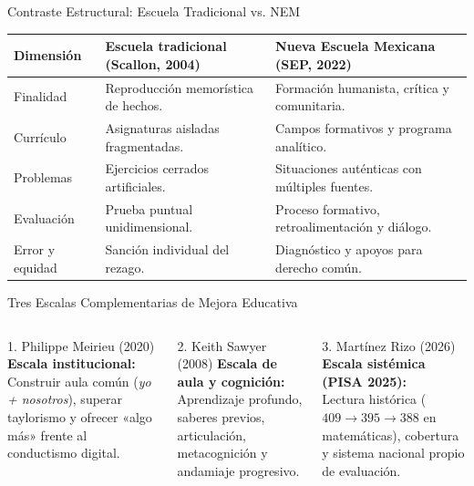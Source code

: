 \documentclass[aspectratio=169,spanish,xcolor=table]{beamer}
\begin{document}
\begin{frame}{Contraste Estructural: Escuela Tradicional vs. NEM}
  \renewcommand{\arraystretch}{1.25}
  \scriptsize
  \begin{tabular}{p{2.6cm}p{5.2cm}p{5.5cm}}
    \toprule
    \textbf{Dimensión} & \textbf{Escuela tradicional (Scallon, 2004)} & \textbf{Nueva Escuela Mexicana (SEP, 2022)} \\
    \midrule
    Finalidad & Reproducción memorística de hechos. & Formación humanista, crítica y comunitaria. \\
    Currículo & Asignaturas aisladas fragmentadas. & Campos formativos y programa analítico. \\
    Problemas & Ejercicios cerrados artificiales. & Situaciones auténticas con múltiples fuentes. \\
    Evaluación & Prueba puntual unidimensional. & Proceso formativo, retroalimentación y diálogo. \\
    Error y equidad & Sanción individual del rezago. & Diagnóstico y apoyos para derecho común. \\
    \bottomrule
  \end{tabular}
\end{frame}

\begin{frame}[plain]
  \centering
  \resizebox{0.97\textwidth}{!}{}
\end{frame}

\begin{frame}{Tres Escalas Complementarias de Mejora Educativa}
  \begin{columns}[T]
      \begin{block}{1. Philippe Meirieu (2020)}
        \scriptsize\textbf{Escala institucional:}\\
        Construir aula común (\textit{yo + nosotros}), superar taylorismo y ofrecer «algo más» frente al conductismo digital.
      \end{block}
      \begin{block}{2. Keith Sawyer (2008)}
        \scriptsize\textbf{Escala de aula y cognición:}\\
        Aprendizaje profundo, saberes previos, articulación, metacognición y andamiaje progresivo.
      \end{block}
      \begin{block}{3. Martínez Rizo (2026)}
        \scriptsize\textbf{Escala sistémica (PISA 2025):}\\
        Lectura histórica ($409\to 395\to 388$ en matemáticas), cobertura y sistema nacional propio de evaluación.
      \end{block}
  \end{columns}
\end{frame}
\end{document}
